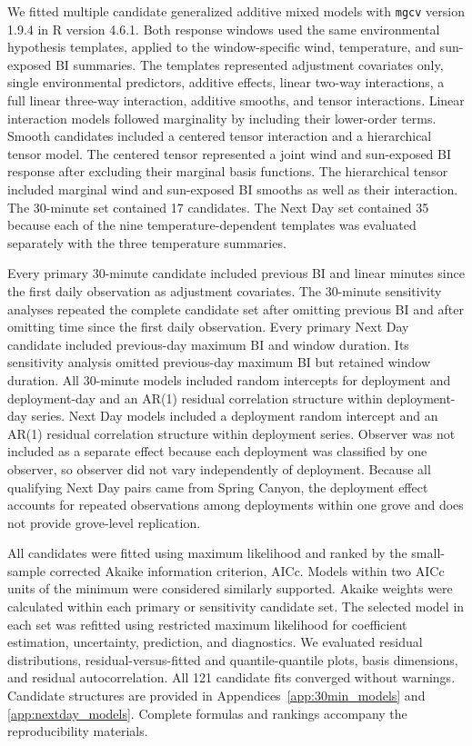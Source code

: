 \documentclass[insects,article,submit,pdftex,moreauthors]{Definitions/mdpi}
\begin{document}
We fitted multiple candidate generalized additive mixed models with \texttt{mgcv} version 1.9.4 in R version 4.6.1. Both response windows used the same environmental hypothesis templates, applied to the window-specific wind, temperature, and sun-exposed BI summaries. The templates represented adjustment covariates only, single environmental predictors, additive effects, linear two-way interactions, a full linear three-way interaction, additive smooths, and tensor interactions. Linear interaction models followed marginality by including their lower-order terms. Smooth candidates included a centered tensor interaction and a hierarchical tensor model. The centered tensor represented a joint wind and sun-exposed BI response after excluding their marginal basis functions. The hierarchical tensor included marginal wind and sun-exposed BI smooths as well as their interaction. The 30-minute set contained 17 candidates. The Next Day set contained 35 because each of the nine temperature-dependent templates was evaluated separately with the three temperature summaries.

Every primary 30-minute candidate included previous BI and linear minutes since the first daily observation as adjustment covariates. The 30-minute sensitivity analyses repeated the complete candidate set after omitting previous BI and after omitting time since the first daily observation. Every primary Next Day candidate included previous-day maximum BI and window duration. Its sensitivity analysis omitted previous-day maximum BI but retained window duration. All 30-minute models included random intercepts for deployment and deployment-day and an AR(1) residual correlation structure within deployment-day series. Next Day models included a deployment random intercept and an AR(1) residual correlation structure within deployment series. Observer was not included as a separate effect because each deployment was classified by one observer, so observer did not vary independently of deployment. Because all qualifying Next Day pairs came from Spring Canyon, the deployment effect accounts for repeated observations among deployments within one grove and does not provide grove-level replication.

All candidates were fitted using maximum likelihood and ranked by the small-sample corrected Akaike information criterion, AICc. Models within two AICc units of the minimum were considered similarly supported. Akaike weights were calculated within each primary or sensitivity candidate set. The selected model in each set was refitted using restricted maximum likelihood for coefficient estimation, uncertainty, prediction, and diagnostics. We evaluated residual distributions, residual-versus-fitted and quantile-quantile plots, basis dimensions, and residual autocorrelation. All 121 candidate fits converged without warnings. Candidate structures are provided in Appendices~\ref{app:30min_models} and \ref{app:nextday_models}. Complete formulas and rankings accompany the reproducibility materials.
\end{document}
